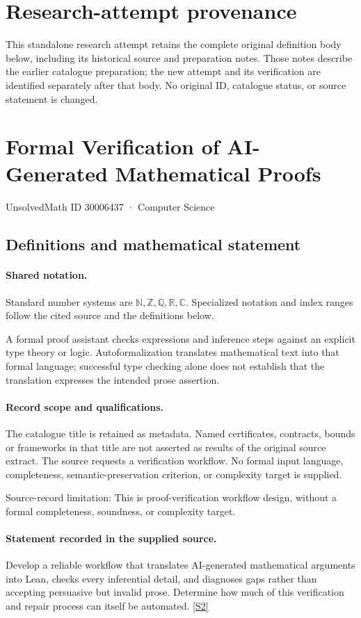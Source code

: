 \documentclass[11pt]{article}
\begin{document}
\section*{Research-attempt provenance}
This standalone research attempt retains the complete original definition body below,
including its historical source and preparation notes. Those notes describe the
earlier catalogue preparation; the new attempt and its verification are identified
separately after that body. No original ID, catalogue status, or source statement is changed.

\section{Formal Verification of AI-Generated Mathematical Proofs}\label{30006437}
{\small UnsolvedMath ID 30006437 · Computer Science}
\subsection{Definitions and mathematical statement}

\paragraph{Shared notation.}Standard number systems are $\mathbb N,\mathbb Z,\mathbb Q,\mathbb R,\mathbb C$. Specialized notation and index ranges follow the cited source and the definitions below.


A formal proof assistant checks expressions and inference steps against an explicit type theory or logic. Autoformalization translates mathematical text into that formal language; successful type checking alone does not establish that the translation expresses the intended prose assertion.
\paragraph{Record scope and qualifications.}
The catalogue title is retained as metadata. Named certificates, contracts, bounds or frameworks in that title are not asserted as results of the original source extract.
The source requests a verification workflow. No formal input language, completeness, semantic-preservation criterion, or complexity target is supplied.

Source-record limitation: This is proof-verification workflow design, without a formal completeness, soundness, or complexity target.
\paragraph{Statement recorded in the supplied source.}
Develop a reliable workflow that translates AI-generated mathematical arguments into Lean, checks every inferential detail, and diagnoses gaps rather than accepting persuasive but invalid prose. Determine how much of this verification and repair process can itself be automated. \href{https://doi.org/10.4171/owr/2025/43}{[S2]}
\end{document}
